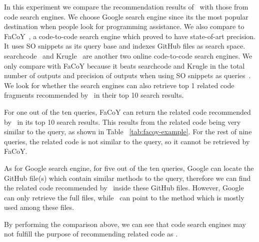 In this experiment we compare the recommendation results of \tool\ with those from code search engines. We choose Google search engine since its the most popular destination when people look for programming assistance. We also compare to {\ttt FaCoY}~\cite{kim2018Facoy}, a code-to-code search engine which proved to have state-of-art precision. It uses SO snippets as its query base and indexes GitHub files as search space. {\ttt searchcode}~\cite{searchcode} and {\ttt Krugle}~\cite{krugle} are another two online code-to-code search engines. We only compare with {\ttt FaCoY} because it beats {\ttt searchcode} and {\ttt Krugle} in the total number of outputs and precision of outputs when using SO snippets as queries~\cite{kim2018Facoy}. 
We look for whether the search engines can also retrieve top 1 related code fragments recommended by \tool\ in their top 10 search results. 

For one out of the ten queries, {\ttt FaCoY} can return the related code recommended by \tool\ in its top 10 search results. This results from the related code being very similar to the query, as shown in Table ~\ref{tab:facoy-example}. For the rest of nine queries, the related code is not similar to the query, so it cannot be retrieved by {\ttt FaCoY}.

As for Google search engine, for five out of the ten queries, Google can locate the GitHub file(s) which contain similar methods to the query, therefore we can find the related code recommended by \tool\ inside these GitHub files. However, Google can only retrieve the full files, while \tool\ can point to the method which is mostly used among these files. 

By performing the comparison above, we can see that code search engines may not fulfill the purpose of recommending related code as \tool{}.
